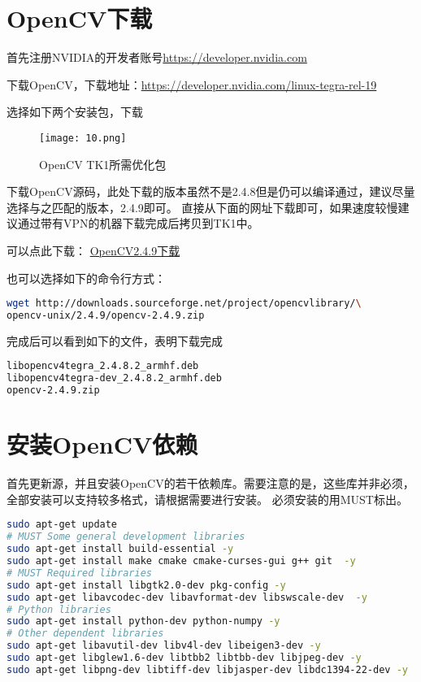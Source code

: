\documentclass[openany]{ctexbook}
\begin{document}
\section{OpenCV下载}
首先注册NVIDIA的开发者账号\url{https://developer.nvidia.com}

下载OpenCV，下载地址：\url{https://developer.nvidia.com/linux-tegra-rel-19}

选择如下两个安装包，下载
\begin{figure}[h]
  \centering
  \texttt{[image: 10.png]}
  \caption{OpenCV TK1所需优化包}
\end{figure}

下载OpenCV源码，此处下载的版本虽然不是2.4.8但是仍可以编译通过，建议尽量选择与之匹配的版本，2.4.9即可。
直接从下面的网址下载即可，如果速度较慢建议通过带有VPN的机器下载完成后拷贝到TK1中。

可以点此下载：
\href{http://downloads.sourceforge.net/project/opencvlibrary/opencv-unix/2.4.9/opencv-2.4.9.zip}{OpenCV2.4.9下载}

也可以选择如下的命令行方式：
{\setmainfont{Courier New Bold}                          %
\begin{lstlisting}[language=bash]
wget http://downloads.sourceforge.net/project/opencvlibrary/\
opencv-unix/2.4.9/opencv-2.4.9.zip
\end{lstlisting}}

完成后可以看到如下的文件，表明下载完成
{\setmainfont{Courier New Bold}                          %
\begin{lstlisting}[language=bash]
libopencv4tegra_2.4.8.2_armhf.deb
libopencv4tegra-dev_2.4.8.2_armhf.deb
opencv-2.4.9.zip
\end{lstlisting}}

\section{安装OpenCV依赖}
首先更新源，并且安装OpenCV的若干依赖库。需要注意的是，这些库并非必须，全部安装可以支持较多格式，请根据需要进行安装。
必须安装的用MUST标出。
{\setmainfont{Courier New Bold}                          %
\begin{lstlisting}[language=bash]
sudo apt-get update
# MUST Some general development libraries
sudo apt-get install build-essential -y
sudo apt-get install make cmake cmake-curses-gui g++ git  -y
# MUST Required libraries
sudo apt-get install libgtk2.0-dev pkg-config -y
sudo apt-get libavcodec-dev libavformat-dev libswscale-dev  -y
# Python libraries
sudo apt-get install python-dev python-numpy -y
# Other dependent libraries
sudo apt-get libavutil-dev libv4l-dev libeigen3-dev -y
sudo apt-get libglew1.6-dev libtbb2 libtbb-dev libjpeg-dev -y
sudo apt-get libpng-dev libtiff-dev libjasper-dev libdc1394-22-dev -y
\end{lstlisting}}
\end{document}
